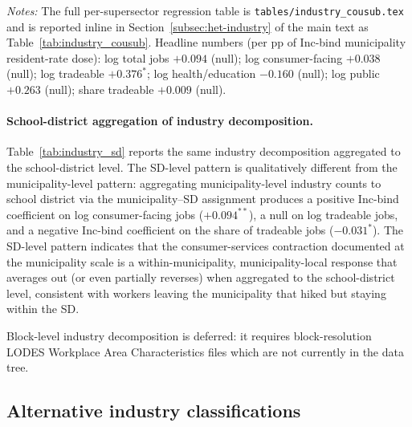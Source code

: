 \documentclass[12pt]{article}
\begin{document}
\begin{table}[H]
    \centering
    \caption{Industry decomposition: municipality level (see Section~\ref{subsec:het-industry} for full table fragment).}
    \label{tab:app-industry-cousub-cite}
    \footnotesize
    \begin{minipage}{0.92\textwidth}
        \textit{Notes:} The full per-supersector regression table is
        \texttt{tables/industry\_cousub.tex} and is reported inline in
        Section~\ref{subsec:het-industry} of the main text as
        Table~\ref{tab:industry_cousub}. Headline numbers (per pp of
        Inc-bind municipality resident-rate dose): log total jobs
        $+0.094$ (null); log consumer-facing $+0.038$ (null); log
        tradeable $+0.376^{*}$; log health/education $-0.160$ (null);
        log public $+0.263$ (null); share tradeable $+0.009$ (null).
    \end{minipage}
\end{table}

\paragraph{School-district aggregation of industry decomposition.}
Table~\ref{tab:industry_sd} reports the same industry decomposition
aggregated to the school-district level. The SD-level pattern is
qualitatively different from the municipality-level pattern:
aggregating municipality-level industry counts to school district via the
municipality--SD assignment produces a positive Inc-bind coefficient on
log consumer-facing jobs ($+0.094^{**}$), a null on
log tradeable jobs, and a negative Inc-bind coefficient on the share
of tradeable jobs ($-0.031^{*}$). The SD-level pattern indicates
that the consumer-services contraction documented at the
municipality scale is a within-municipality, municipality-local response that
averages out (or even partially reverses) when aggregated to the
school-district level, consistent with workers leaving the municipality that
hiked but staying within the SD.

Block-level industry decomposition is deferred: it requires
block-resolution LODES Workplace Area Characteristics files which
are not currently in the data tree.

\subsection{Alternative industry classifications}
\label{app:industry-alt}
\end{document}
